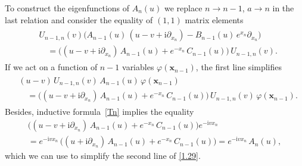 \documentclass[11pt]{article}
\numberwithin{equation}{section}
\theoremstyle{plain}
\theoremstyle{definition}
\renewcommand{\phi}{\varphi}
\renewcommand{\imath}{\mathrm{i}}
\begin{document}
To construct the eigenfunctions of $A_n(u)$ we replace $n \to n - 1$, $a \to n$ in the last relation and consider the equality of $(1,1)$ matrix elements
\begin{align}\label{1.29}
	\begin{aligned}
		& U_{n - 1, n}(v) \bigl( A_{n - 1}(u) \, (u - v + \imath \partial_{x_n}) - B_{n - 1}(u) \, e^{x_{n}} \partial_{x_n} \bigr) \\[6pt]
		& \quad = \bigl( (u - v + \imath \partial_{x_n}) \, A_{n - 1}(u) + e^{-x_n} \, C_{n - 1}(u) \bigr) \, U_{n - 1, n}(v).
	\end{aligned}
\end{align}
If we act on a function of $n - 1$ variables $\phi(\bm{x}_{n - 1})$, the first line simplifies
\begin{align} \label{UTM11-phi}
	\begin{aligned}
		&(u - v ) \, U_{n - 1, n}(v) \, A_{n - 1}(u) \, \phi(\bm{x}_{n - 1}) \\[6pt]
		& \quad = \bigl( (u - v + \imath \partial_{x_n}) \, A_{n - 1}(u) + e^{-x_n} \, C_{n - 1}(u) \bigr) \, U_{n - 1, n}(v) \, \phi(\bm{x}_{n - 1}).
	\end{aligned}
\end{align}
Besides, inductive formula~\eqref{Tn} implies the equality
\begin{multline} \label{ACe}
	\bigl( (u - v + \imath \partial_{x_n}) \, A_{n - 1}(u) + e^{-x_n} \, C_{n - 1}(u) \bigr) e^{-\imath v x_n} \\[6pt]
	= e^{-\imath v x_n} \, \bigl( (u + \imath \partial_{x_n}) \, A_{n - 1}(u) + e^{-x_n} \, C_{n - 1}(u) \bigr) = e^{-\imath v x_n} \, A_n(u),
\end{multline}
which we can use to simplify the second line of \eqref{1.29}. 
\end{document}
